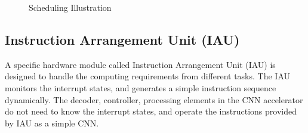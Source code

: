 \begin{figure}[t]
\begin{minipage}[t]{0.3\linewidth}
	\end{minipage}
	\begin{minipage}[t]{0.3\linewidth}  
	\centering  
	\end{minipage}
	\caption{ Scheduling Illustration
  }
\label{fig:dslamresult}
\end{figure}


\subsection{ Instruction Arrangement Unit (IAU) }

A specific hardware module called Instruction Arrangement Unit (IAU) is designed to handle the computing requirements from different tasks. The IAU monitors the interrupt states, and generates a simple instruction sequence dynamically. The decoder, controller, processing elements in the CNN accelerator do not need to know the interrupt states, and operate the instructions provided by IAU as a simple CNN.
